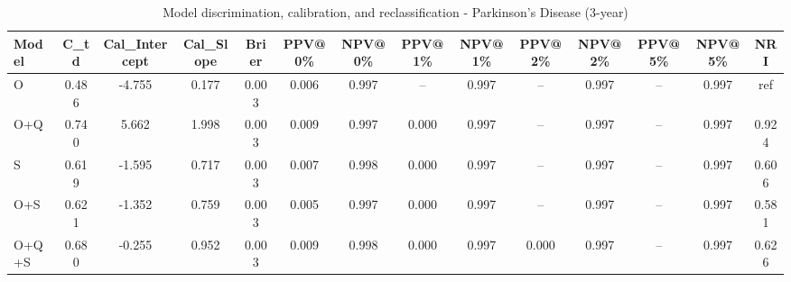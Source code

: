 \begin{table}[htbp]
\centering
\small
\caption{Model discrimination, calibration, and reclassification - Parkinson's Disease (3-year)}
\label{tab:perf_pd_3y}
\begin{tabular}{lccccccccccccc}
\toprule
Model & C\_td & Cal\_Intercept & Cal\_Slope & Brier & PPV@0\% & NPV@0\% & PPV@1\% & NPV@1\% & PPV@2\% & NPV@2\% & PPV@5\% & NPV@5\% & NRI \\
\midrule
O & 0.486 & -4.755 & 0.177 & 0.003 & 0.006 & 0.997 & -- & 0.997 & -- & 0.997 & -- & 0.997 & ref \\
O+Q & 0.740 & 5.662 & 1.998 & 0.003 & 0.009 & 0.997 & 0.000 & 0.997 & -- & 0.997 & -- & 0.997 & 0.924 \\
S & 0.619 & -1.595 & 0.717 & 0.003 & 0.007 & 0.998 & 0.000 & 0.997 & -- & 0.997 & -- & 0.997 & 0.606 \\
O+S & 0.621 & -1.352 & 0.759 & 0.003 & 0.005 & 0.997 & 0.000 & 0.997 & -- & 0.997 & -- & 0.997 & 0.581 \\
O+Q+S & 0.680 & -0.255 & 0.952 & 0.003 & 0.009 & 0.998 & 0.000 & 0.997 & 0.000 & 0.997 & -- & 0.997 & 0.626 \\
\bottomrule
\end{tabular}
\end{table}